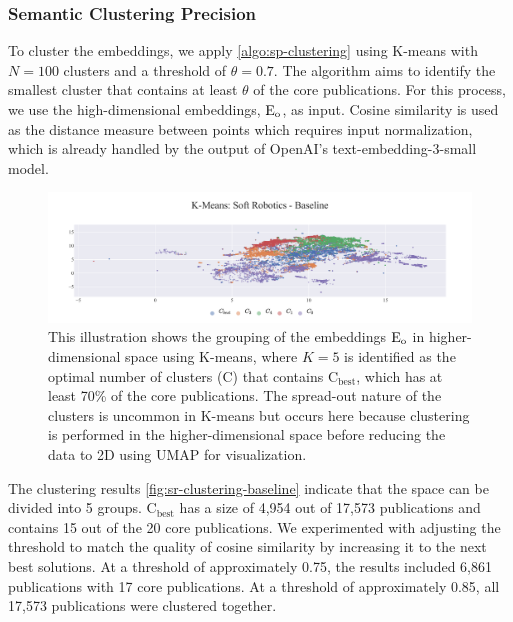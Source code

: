 \subsubsection{Semantic Clustering Precision}

To cluster the embeddings, we apply \autoref{algo:sp-clustering} using K-means with \( N = 100 \) clusters and a threshold of \( \theta = 0.7 \). The algorithm aims to identify the smallest cluster that contains at least $\theta$ of the core publications. For this process, we use the high-dimensional embeddings, $\mathop{}\!\mathrm{E_{o}}$, as input. Cosine similarity is used as the distance measure between points which requires input normalization, which is already handled by the output of OpenAI's text-embedding-3-small model.

\begin{figure}[!b]
	\hspace*{-1cm}	
	\includegraphics[scale=0.45]{pics/sr-clustering-baseline.pdf}
	\caption[Semantic Clustering: Soft Robotics]{This illustration shows the grouping of the embeddings $\mathop{}\!\mathrm{E_{o}}$ in higher-dimensional space using K-means, where $K=5$ is identified as the optimal number of clusters (C) that contains $\text{C}_{\text{best}}$, which has at least 70\% of the core publications. The spread-out nature of the clusters is uncommon in K-means but occurs here because clustering is performed in the higher-dimensional space before reducing the data to 2D using UMAP for visualization.}\label{fig:sr-clustering-baseline}
\end{figure}

The clustering results \autoref{fig:sr-clustering-baseline} indicate that the space can be divided into 5 groups. $\text{C}_{\text{best}}$ has a size of 4,954 out of 17,573 publications and contains 15 out of the 20 core publications. We experimented with adjusting the threshold to match the quality of cosine similarity by increasing it to the next best solutions. At a threshold of approximately 0.75, the results included 6,861 publications with 17 core publications. At a threshold of approximately 0.85, all 17,573 publications were clustered together.

